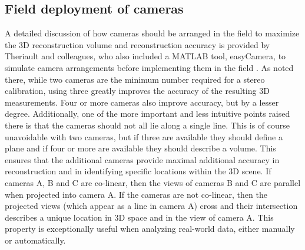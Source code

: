 \documentclass[fleqn,10pt]{wlpeerj}
\begin{document}
\subsection*{Field deployment of cameras}
A detailed discussion of how cameras should be arranged in the field to maximize the 3D reconstruction volume and reconstruction accuracy is provided by Theriault and colleagues, who also included a MATLAB tool, easyCamera, to simulate camera arrangements before implementing them in the field \citep{Theriault:2014}. As noted there, while two cameras are the minimum number required for a stereo calibration, using three greatly improves the accuracy of the resulting 3D measurements.  Four or more cameras also improve accuracy, but by a lesser degree. Additionally, one of the more important and less intuitive points raised there is that the cameras should not all lie along a single line. This is of course unavoidable with two cameras, but if three are available they should define a plane and if four or more are available they should describe a volume. This ensures that the additional cameras provide maximal additional accuracy in reconstruction and in identifying specific locations within the 3D scene. If cameras A, B and C are co-linear, then the views of cameras B and C are parallel when projected into camera A.  If the cameras are not co-linear, then the projected views (which appear as a line in camera A) cross and their intersection describes a unique location in 3D space and in the view of camera A. This property is exceptionally useful when analyzing real-world data, either manually or automatically.
\end{document}
